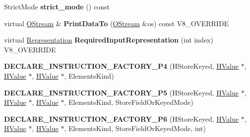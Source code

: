 \begin{DoxyCompactItemize}
\item 
\hypertarget{classv8_1_1internal_1_1_v8___f_i_n_a_l_a2aedf779fef90f5fec7b463341d87c42}{}Strict\+Mode {\bfseries strict\+\_\+mode} () const \label{classv8_1_1internal_1_1_v8___f_i_n_a_l_a2aedf779fef90f5fec7b463341d87c42}

\item 
\hypertarget{classv8_1_1internal_1_1_v8___f_i_n_a_l_ac450dad970b14246be761ccf5004924b}{}virtual \hyperlink{classv8_1_1internal_1_1_o_stream}{O\+Stream} \& {\bfseries Print\+Data\+To} (\hyperlink{classv8_1_1internal_1_1_o_stream}{O\+Stream} \&os) const V8\+\_\+\+O\+V\+E\+R\+R\+I\+D\+E\label{classv8_1_1internal_1_1_v8___f_i_n_a_l_ac450dad970b14246be761ccf5004924b}

\item 
\hypertarget{classv8_1_1internal_1_1_v8___f_i_n_a_l_a6c6d1f37f40b113d8f4062f1ffff7215}{}virtual \hyperlink{classv8_1_1internal_1_1_representation}{Representation} {\bfseries Required\+Input\+Representation} (int index) V8\+\_\+\+O\+V\+E\+R\+R\+I\+D\+E\label{classv8_1_1internal_1_1_v8___f_i_n_a_l_a6c6d1f37f40b113d8f4062f1ffff7215}

\item 
\hypertarget{classv8_1_1internal_1_1_v8___f_i_n_a_l_a637fd94bc2e9fa657ea3301aa2b59733}{}{\bfseries D\+E\+C\+L\+A\+R\+E\+\_\+\+I\+N\+S\+T\+R\+U\+C\+T\+I\+O\+N\+\_\+\+F\+A\+C\+T\+O\+R\+Y\+\_\+\+P4} (H\+Store\+Keyed, \hyperlink{classv8_1_1internal_1_1_h_value}{H\+Value} $\ast$, \hyperlink{classv8_1_1internal_1_1_h_value}{H\+Value} $\ast$, \hyperlink{classv8_1_1internal_1_1_h_value}{H\+Value} $\ast$, Elements\+Kind)\label{classv8_1_1internal_1_1_v8___f_i_n_a_l_a637fd94bc2e9fa657ea3301aa2b59733}

\item 
\hypertarget{classv8_1_1internal_1_1_v8___f_i_n_a_l_aecc686de2492202d2674a9dd6201340e}{}{\bfseries D\+E\+C\+L\+A\+R\+E\+\_\+\+I\+N\+S\+T\+R\+U\+C\+T\+I\+O\+N\+\_\+\+F\+A\+C\+T\+O\+R\+Y\+\_\+\+P5} (H\+Store\+Keyed, \hyperlink{classv8_1_1internal_1_1_h_value}{H\+Value} $\ast$, \hyperlink{classv8_1_1internal_1_1_h_value}{H\+Value} $\ast$, \hyperlink{classv8_1_1internal_1_1_h_value}{H\+Value} $\ast$, Elements\+Kind, Store\+Field\+Or\+Keyed\+Mode)\label{classv8_1_1internal_1_1_v8___f_i_n_a_l_aecc686de2492202d2674a9dd6201340e}

\item 
\hypertarget{classv8_1_1internal_1_1_v8___f_i_n_a_l_a69924f61f1d4b3ca0c719f86be7c5559}{}{\bfseries D\+E\+C\+L\+A\+R\+E\+\_\+\+I\+N\+S\+T\+R\+U\+C\+T\+I\+O\+N\+\_\+\+F\+A\+C\+T\+O\+R\+Y\+\_\+\+P6} (H\+Store\+Keyed, \hyperlink{classv8_1_1internal_1_1_h_value}{H\+Value} $\ast$, \hyperlink{classv8_1_1internal_1_1_h_value}{H\+Value} $\ast$, \hyperlink{classv8_1_1internal_1_1_h_value}{H\+Value} $\ast$, Elements\+Kind, Store\+Field\+Or\+Keyed\+Mode, int)\label{classv8_1_1internal_1_1_v8___f_i_n_a_l_a69924f61f1d4b3ca0c719f86be7c5559}


\end{DoxyCompactItemize}
